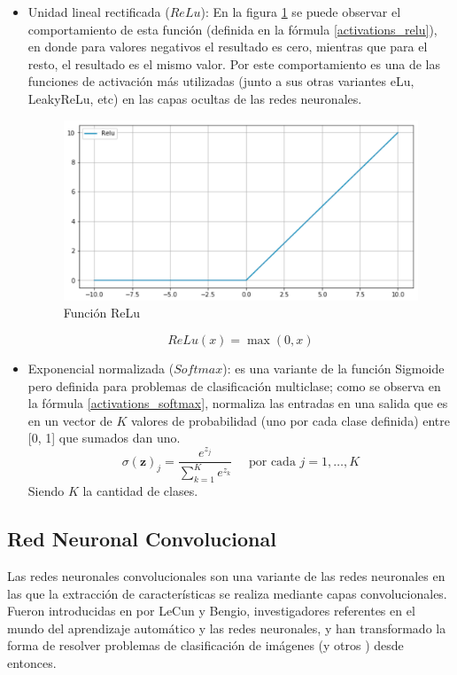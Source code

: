 \begin{itemize}
 	\item Unidad lineal rectificada (\(ReLu\)): En la figura \ref{fig:activationsrelu} se puede observar el comportamiento de esta función (definida en la fórmula \ref{activations_relu}), en donde para valores negativos el resultado es cero, mientras que para el resto, el resultado es el mismo valor. Por este comportamiento es una de las funciones de activación más utilizadas (junto a sus otras variantes eLu, LeakyReLu, etc) en las capas ocultas de las redes neuronales.
 	\begin{figure}[!h]
 		\centering
 		\includegraphics[width=0.7\linewidth]{images/activations_relu}
 		\caption[Función ReLu]{Función ReLu}
 		\label{fig:activationsrelu}
 	\end{figure}
 	\begin{equation}\label{activations_relu}
 	ReLu(x)=\max (0, x)
 	\end{equation}
	\item\label{item:softmax} Exponencial normalizada (\(Softmax\)): es una variante de la función Sigmoide pero definida para problemas de clasificación multiclase; como se observa en la fórmula \ref{activations_softmax}, normaliza las entradas en una salida que es en un vector de \(K\) valores de probabilidad (uno por cada clase definida) entre [0, 1] que sumados dan uno.
	\begin{equation}
\label{activations_softmax}
	\sigma(\mathbf{z})_{j}=\frac{e^{z_{j}}}{\sum_{k=1}^{K} e^{z_{k}}} \quad \text { por cada } j=1, \ldots, K
	\end{equation}
	Siendo \(K\) la cantidad de clases.
 \end{itemize}

	
\subsection{Red Neuronal Convolucional}
Las redes neuronales convolucionales son una variante de las redes neuronales en las que la extracción de características se realiza mediante capas convolucionales. Fueron introducidas en \cite{lecun1995convolutional} por LeCun y Bengio, investigadores referentes en el mundo del aprendizaje automático y las redes neuronales, y han transformado la forma de resolver problemas de clasificación de imágenes (y otros ) desde entonces.

